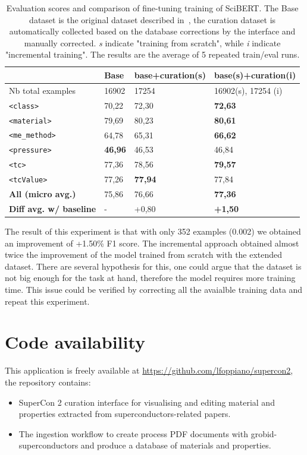 \documentclass[a4paper]{article}
\begin{document}
\begin{table}[ht]
\centering
\begin{tabular}{|l|l|l|l|}
\hline
& \textbf{Base} & \textbf{base+curation(s)} & \textbf{base(s)+curation(i)} \\ 
\hline
\hline
Nb total examples & 16902 & 17254 & 16902(s), 17254 (i)\\ 
\hline
\texttt{<class>}        & 70,22             & 72,30             & \textbf{72,63} \\ 
\texttt{<material>}     & 79,69             & 80,23             & \textbf{80,61} \\ 
\texttt{<me\_method>}   & 64,78             & 65,31             & \textbf{66,62} \\ 
\texttt{<pressure>}     & \textbf{46,96}    & 46,53             & 46,84 \\ 
\texttt{<tc>}           & 77,36             & 78,56             & \textbf{79,57} \\ 
\texttt{<tcValue>}      & 77,26             & \textbf{77,94}    & 77,84 \\ 
\hline
\textbf{All (micro avg.)} & 75,86           & 76,66             & \textbf{77,36} \\ 
\hline
\textbf{Diff avg. w/ baseline}& -           & +0,80             & \textbf{+1,50} \\ 
\hline
\end{tabular}
\caption{Evaluation scores and comparison of fine-tuning training of SciBERT. The Base dataset is the original dataset described in~\cite{lfoppiano2023automatic}, the curation dataset is automatically collected based on the database corrections by the interface and manually corrected. \textit{s} indicate "training from scratch", while \textit{i} indicate "incremental training". The results are the average of 5 repeated train/eval runs. }
\label{tab:evaluation-curation-training}
\end{table}

The result of this experiment is that with only 352 examples (0.002) we obtained an improvement of +1.50\% F1 score. The incremental approach obtained almost twice the improvement of the model trained from scratch with the extended dataset. 
There are several hypothesis for this, one could argue that the dataset is not big enough for the task at hand, therefore the model requires more training time. This issue could be verified by correcting all the avaialble training data and repeat this experiment. 


\section{Code availability}
This application is freely available at \url{https://github.com/lfoppiano/supercon2}, the repository contains:
\begin{itemize}
\item SuperCon 2 curation interface for visualising and editing material and properties extracted from superconductors-related papers.
\item The ingestion workflow to create process PDF documents with grobid-superconductors and produce a database of materials and properties.
\end{itemize}
\end{document}
